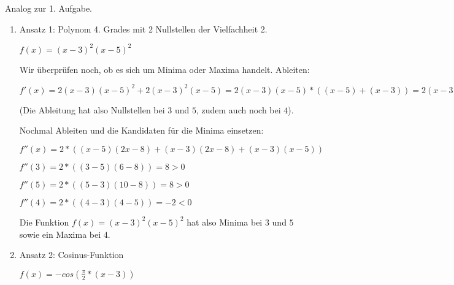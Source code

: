 \item Analog zur 1. Aufgabe.

\begin{enumerate}

\item Ansatz 1: Polynom 4. Grades mit 2 Nullstellen der Vielfachheit 2.

$f(x) = (x-3)^2(x-5)^2$

Wir überprüfen noch, ob es sich um Minima oder Maxima handelt. Ableiten:

$f'(x) = 2(x-3)(x-5)^2+2(x-3)^2(x-5) = 2(x-3)(x-5)*((x-5)+(x-3)) = 2(x-3)(x-5)(2x-8)$

(Die Ableitung hat also Nullstellen bei $3$ und $5$, zudem auch noch bei $4$).

Nochmal Ableiten und die Kandidaten für die Minima einsetzen:

$f''(x) = 2*((x-5)(2x-8)+(x-3)(2x-8)+(x-3)(x-5))$

$f''(3) = 2*((3-5)(6-8)) = 8 > 0$

$f''(5) = 2*((5-3)(10-8)) = 8 > 0$

$f''(4) = 2*((4-3)(4-5)) = -2 < 0$

Die Funktion $f(x) = (x-3)^2(x-5)^2$ hat also Minima bei $3$ und $5$ sowie ein Maxima bei $4$.

\item Ansatz 2: Cosinus-Funktion

$f(x) = -cos(\frac{\pi}{2}*(x-3))$

\end{enumerate}

